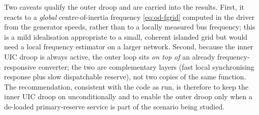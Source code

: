 Two caveats qualify the outer droop and are carried into the results. First, it
reacts to a \emph{global} centre-of-inertia frequency \eqref{eq:od-fgrid}
computed in the driver from the generator speeds, rather than to a locally
measured bus frequency; this is a mild idealisation appropriate to a small,
coherent islanded grid but would need a local frequency estimator on a larger
network. Second, because the inner UIC droop is always active, the outer loop
sits \emph{on top of} an already frequency-responsive converter; the two are
complementary layers (fast local synchronising response plus slow dispatchable
reserve), not two copies of the same function. The recommendation, consistent
with the code as run, is therefore to keep the inner UIC droop on unconditionally
and to enable the outer droop only when a de-loaded primary-reserve service is
part of the scenario being studied.
